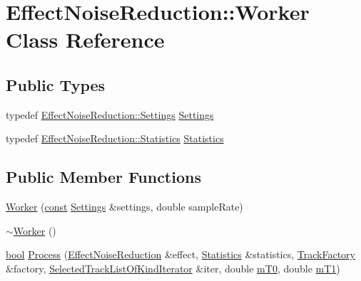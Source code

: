 \hypertarget{class_effect_noise_reduction_1_1_worker}{}\section{Effect\+Noise\+Reduction\+:\+:Worker Class Reference}
\label{class_effect_noise_reduction_1_1_worker}
\subsection*{Public Types}
\begin{DoxyCompactItemize}
\item 
typedef \hyperlink{class_effect_noise_reduction_1_1_settings}{Effect\+Noise\+Reduction\+::\+Settings} \hyperlink{class_effect_noise_reduction_1_1_worker_a2904764d08bbfe694e12b1bdd36f41b8}{Settings}
\item 
typedef \hyperlink{class_effect_noise_reduction_1_1_statistics}{Effect\+Noise\+Reduction\+::\+Statistics} \hyperlink{class_effect_noise_reduction_1_1_worker_ac4d7f70570114b011e4e2538cbbe813b}{Statistics}
\end{DoxyCompactItemize}
\subsection*{Public Member Functions}
\begin{DoxyCompactItemize}
\item 
\hyperlink{class_effect_noise_reduction_1_1_worker_a1c81a2c1a4e3a6c887146d682e671a4a}{Worker} (\hyperlink{getopt1_8c_a2c212835823e3c54a8ab6d95c652660e}{const} \hyperlink{class_effect_noise_reduction_1_1_worker_a2904764d08bbfe694e12b1bdd36f41b8}{Settings} \&settings, double sample\+Rate)
\item 
\hyperlink{class_effect_noise_reduction_1_1_worker_a54eef263ffe75d9782464b54e9cd9bfd}{$\sim$\+Worker} ()
\item 
\hyperlink{mac_2config_2i386_2lib-src_2libsoxr_2soxr-config_8h_abb452686968e48b67397da5f97445f5b}{bool} \hyperlink{class_effect_noise_reduction_1_1_worker_a65f7cf1d082c6116b0c22eedbde2375b}{Process} (\hyperlink{class_effect_noise_reduction}{Effect\+Noise\+Reduction} \&effect, \hyperlink{class_effect_noise_reduction_1_1_worker_ac4d7f70570114b011e4e2538cbbe813b}{Statistics} \&statistics, \hyperlink{class_track_factory}{Track\+Factory} \&factory, \hyperlink{class_selected_track_list_of_kind_iterator}{Selected\+Track\+List\+Of\+Kind\+Iterator} \&iter, double \hyperlink{class_effect_ae83563966df5c0b3aba90dd183b15b53}{m\+T0}, double \hyperlink{class_effect_a7681f0ae7a8245659b002078e78ef146}{m\+T1})
\end{DoxyCompactItemize}


